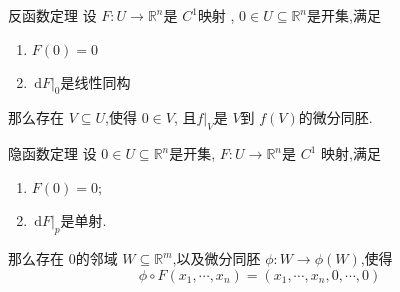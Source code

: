 \documentclass[../../古典微分几何.tex]{subfiles}
\begin{document}
\hspace*{\fill} 

\begin{theorem}{反函数定理}
    设 \(  F: U\to \mathbb{R} ^{n}  \)是 \(  C^{1}  \)映射 , \(  0 \in U \subseteq \mathbb{R} ^{n}  \)是开集,满足
    \begin{enumerate}
        \item  \(  F\left( 0 \right)= 0   \)
        \item \(  \left. \,\mathrm{d} F \right|_{0}  \)是线性同构  
    \end{enumerate}
      那么存在 \(  V\subseteq U  \),使得 \(  0 \in V  \), 且\(  f|_{V}  \)是  \(  V  \)到 \(  f\left( V \right)   \)的微分同胚.     
\end{theorem}

\begin{theorem}{隐函数定理}
    设 \(  0 \in U \subseteq \mathbb{R} ^{n}  \)是开集, \(  F: U\to \mathbb{R} ^{n}  \)是  \(  C^{1}  \)   映射,满足 
    \begin{enumerate}
        \item \(  F\left( 0 \right)= 0   \);
        \item \(  \,\mathrm{d} F|_{p}  \)是单射.  
    \end{enumerate}
     那么存在 \(  0  \)的邻域 \(  W\subseteq \mathbb{R} ^{m}  \),以及微分同胚 \(  \phi : W\to \phi \left( W \right)   \),使得 \[
     \phi \circ F\left(  x_1,\cdots,x_n  \right)= \left(  x_1,\cdots,x_n ,0,\cdots ,0 \right)  
     \]   
\end{theorem}
\end{document}
